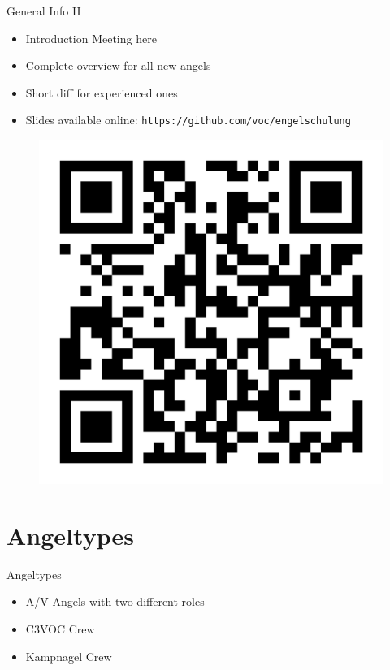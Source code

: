 \documentclass[aspectratio=169]{beamer}
\begin{document}
\begin{frame}{General Info II}
	\begin{itemize}
		\item Introduction Meeting here
		\item Complete overview for all new angels
		\item Short diff for experienced ones
		\item Slides available online: \texttt{https://github.com/voc/engelschulung}
	\end{itemize}
	\begin{figure} 
		\centering
		\includegraphics[height=0.4\textheight]{images/qr-code.png}
	\end{figure}
\end{frame}

\section{Angeltypes}
\begin{frame}{Angeltypes}
	\begin{itemize}
		\item A/V Angels with two different roles
		\item C3VOC Crew
		\item Kampnagel Crew 
	\end{itemize}
\end{frame}
\end{document}

